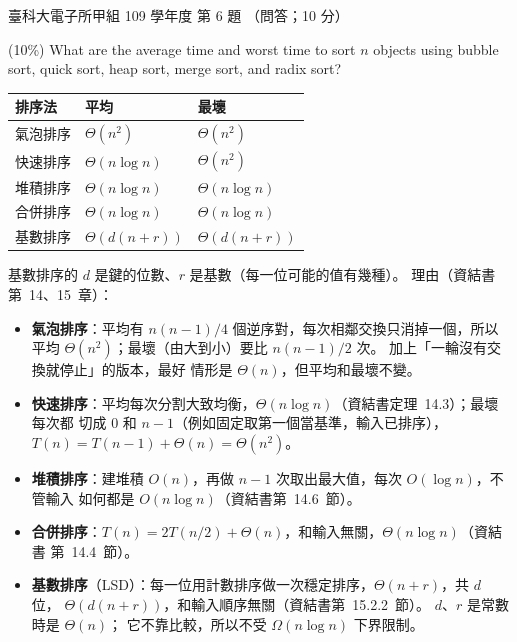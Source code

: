 \begin{pastexam}[label={px:ntust-109-et-ds-06}]{臺科大電子所甲組 109 學年度 第 6 題}
（問答；10 分）

(10\%) What are the average time and worst time to sort $n$ objects using bubble sort, quick sort,
heap sort, merge sort, and radix sort?
\end{pastexam}

\begin{pastsoln}
\begin{center}
\begin{tabular}{lll}
\toprule
排序法 & 平均 & 最壞 \\
\midrule
氣泡排序 & $\Theta(n^2)$ & $\Theta(n^2)$ \\
快速排序 & $\Theta(n\log n)$ & $\Theta(n^2)$ \\
堆積排序 & $\Theta(n\log n)$ & $\Theta(n\log n)$ \\
合併排序 & $\Theta(n\log n)$ & $\Theta(n\log n)$ \\
基數排序 & $\Theta(d(n + r))$ & $\Theta(d(n + r))$ \\
\bottomrule
\end{tabular}
\end{center}
基數排序的 $d$ 是鍵的位數、$r$ 是基數（每一位可能的值有幾種）。 理由（資結書第~14、15~章）：
\begin{itemize}
\item \textbf{氣泡排序}：平均有 $n(n - 1)/4$ 個逆序對，每次相鄰交換只消掉一個，所以平均
$\Theta(n^2)$；最壞（由大到小）要比 $n(n - 1)/2$ 次。 加上「一輪沒有交換就停止」的版本，最好
情形是 $\Theta(n)$，但平均和最壞不變。
\item \textbf{快速排序}：平均每次分割大致均衡，$\Theta(n\log n)$（資結書定理~14.3）；最壞每次都
切成 $0$ 和 $n - 1$（例如固定取第一個當基準，輸入已排序），$T(n) = T(n - 1) + \Theta(n) =
\Theta(n^2)$。
\item \textbf{堆積排序}：建堆積 $O(n)$，再做 $n - 1$ 次取出最大值，每次 $O(\log n)$，不管輸入
如何都是 $O(n\log n)$（資結書第~14.6~節）。
\item \textbf{合併排序}：$T(n) = 2T(n/2) + \Theta(n)$，和輸入無關，$\Theta(n\log n)$（資結書
第~14.4~節）。
\item \textbf{基數排序}（LSD）：每一位用計數排序做一次穩定排序，$\Theta(n + r)$，共 $d$ 位，
$\Theta(d(n + r))$，和輸入順序無關（資結書第~15.2.2~節）。 $d$、$r$ 是常數時是 $\Theta(n)$；
它不靠比較，所以不受 $\Omega(n\log n)$ 下界限制。
\end{itemize}
\end{pastsoln}
